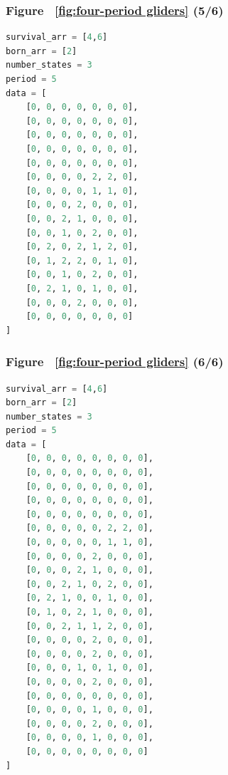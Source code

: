\documentclass[12pt]{article}
\numberwithin{figure}{section} %
\begin{document}
\noindent\begin{minipage}{.45\textwidth}
\subsubsection{Figure ~\ref{fig:four-period gliders} (5/6)}
\label{subsubsection:four-period gliders(5/6)}
\begin{lstlisting}[language = Python]
survival_arr = [4,6]
born_arr = [2]
number_states = 3
period = 5
data = [
    [0, 0, 0, 0, 0, 0, 0],
    [0, 0, 0, 0, 0, 0, 0],
    [0, 0, 0, 0, 0, 0, 0],
    [0, 0, 0, 0, 0, 0, 0],
    [0, 0, 0, 0, 0, 0, 0],
    [0, 0, 0, 0, 2, 2, 0],
    [0, 0, 0, 0, 1, 1, 0],
    [0, 0, 0, 2, 0, 0, 0],
    [0, 0, 2, 1, 0, 0, 0],
    [0, 0, 1, 0, 2, 0, 0],
    [0, 2, 0, 2, 1, 2, 0],
    [0, 1, 2, 2, 0, 1, 0],
    [0, 0, 1, 0, 2, 0, 0],
    [0, 2, 1, 0, 1, 0, 0],
    [0, 0, 0, 2, 0, 0, 0],
    [0, 0, 0, 0, 0, 0, 0]
]
\end{lstlisting}
\end{minipage}\hfill
\begin{minipage}{.5\textwidth}
\subsubsection{Figure ~\ref{fig:four-period gliders} (6/6)}
\label{subsubsection:four-period gliders(6/6)}
\begin{lstlisting}[language = Python]
survival_arr = [4,6]
born_arr = [2]
number_states = 3
period = 5
data = [
    [0, 0, 0, 0, 0, 0, 0, 0],
    [0, 0, 0, 0, 0, 0, 0, 0],
    [0, 0, 0, 0, 0, 0, 0, 0],
    [0, 0, 0, 0, 0, 0, 0, 0],
    [0, 0, 0, 0, 0, 0, 0, 0],
    [0, 0, 0, 0, 0, 2, 2, 0],
    [0, 0, 0, 0, 0, 1, 1, 0],
    [0, 0, 0, 0, 2, 0, 0, 0],
    [0, 0, 0, 2, 1, 0, 0, 0],
    [0, 0, 2, 1, 0, 2, 0, 0],
    [0, 2, 1, 0, 0, 1, 0, 0],
    [0, 1, 0, 2, 1, 0, 0, 0],
    [0, 0, 2, 1, 1, 2, 0, 0],
    [0, 0, 0, 0, 2, 0, 0, 0],
    [0, 0, 0, 0, 2, 0, 0, 0],
    [0, 0, 0, 1, 0, 1, 0, 0],
    [0, 0, 0, 0, 2, 0, 0, 0],
    [0, 0, 0, 0, 0, 0, 0, 0],
    [0, 0, 0, 0, 1, 0, 0, 0],
    [0, 0, 0, 0, 2, 0, 0, 0],
    [0, 0, 0, 0, 1, 0, 0, 0],
    [0, 0, 0, 0, 0, 0, 0, 0]
]

\end{lstlisting}
\end{minipage}
\end{document}
